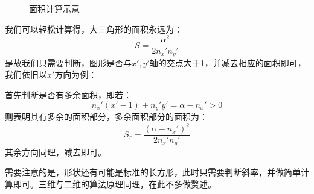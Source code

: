 \documentclass[lang=cn,11pt,a4paper]{elegantpaper}
\begin{document}
\begin{figure}[htbp]
    \centering
    \caption{面积计算示意}
    \label{fig:mianjijisuan}
\end{figure}
我们可以轻松计算得，大三角形的面积永远为：
\begin{equation}
    S = \frac{\alpha^2}{2n_x'n_y'}
\end{equation}
是故我们只需要判断，图形是否与$x',y'$轴的交点大于1，并减去相应的面积即可，我们依旧以$x'$方向为例：\par
首先判断是否有多余面积，即若：
\begin{equation}
    n_x'(x'-1)+n_y'y'=\alpha - n_x'>0
\end{equation}
则表明其有多余的面积部分，多余面积部分的面积为：
\begin{equation}
    S_r = \frac{(\alpha-n_x')^2}{2n_x'n_y'}
\end{equation}
其余方向同理，减去即可。\par
需要注意的是，形状还有可能是标准的长方形，此时只需要判断斜率，并做简单计算即可。三维与二维的算法原理同理，在此不多做赘述。
\end{document}
